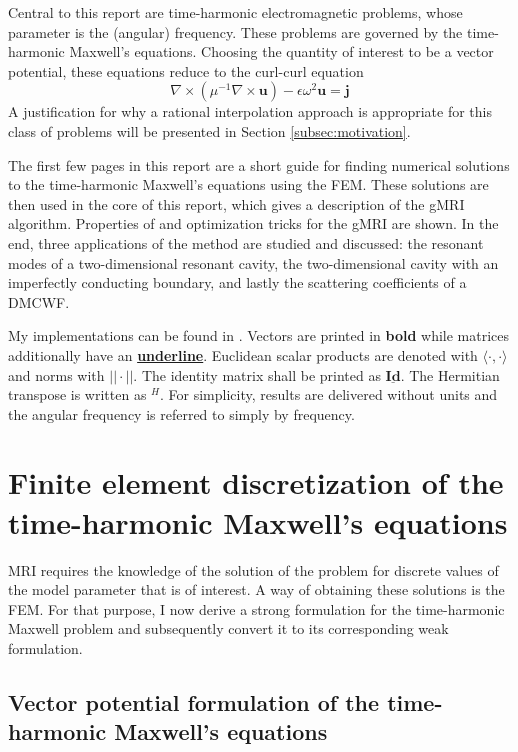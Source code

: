 \documentclass[11pt, a4paper]{article}
\begin{document}
Central to this report are time-harmonic electromagnetic problems, whose 
parameter is the (angular) frequency. These problems are governed by
the time-harmonic Maxwell's equations. Choosing the quantity of interest
to be a vector potential, these equations reduce to the curl-curl equation
\begin{equation}
    \nabla \times (\mu^{-1} \nabla \times \mathbf{u}) - \epsilon \omega^2 \mathbf{u} = \mathbf{j}
\end{equation}
A justification for why a rational interpolation approach is appropriate for
this class of problems will be presented in Section \ref{subsec:motivation}.

The first few pages in this report are a short guide for finding numerical 
solutions to the time-harmonic Maxwell's equations using the \acrfull{FEM}.
These solutions are then used in the core of this report, which gives a description
of the \acrfull{gMRI} algorithm. Properties of and optimization tricks for the
\acrshort{gMRI} are shown. In the end, three applications of the method are studied and
discussed: the resonant modes of a two-dimensional resonant cavity,
the two-dimensional cavity with an imperfectly conducting boundary, and lastly
the scattering coefficients of a \acrfull{DMCWF}.

My implementations can be found in \cite{git}. Vectors are printed in \textbf{bold}
while matrices additionally have an \textbf{\underline{underline}}. 
Euclidean scalar products are denoted with $\langle \cdot , \cdot \rangle$
and norms with $||\cdot||$. The identity matrix shall be printed as $\mathbf{\underline{Id}}$.
The Hermitian transpose is written as $^{H}$. For simplicity, results are delivered without units
and the angular frequency is referred to simply by frequency.

\newpage
\section{Finite element discretization of the time-harmonic Maxwell's equations}
\label{sec:maxwell}

\acrfull{MRI} requires the knowledge of the solution of the problem for discrete 
values of the model parameter that is of interest. A way of obtaining these
solutions is the \acrfull{FEM}. For that purpose, I now derive a strong formulation
for the time-harmonic Maxwell problem and subsequently convert it to its
corresponding weak formulation.

\subsection{Vector potential formulation of the time-harmonic Maxwell's equations}
\label{subsec:maxwell-potential}
\end{document}
